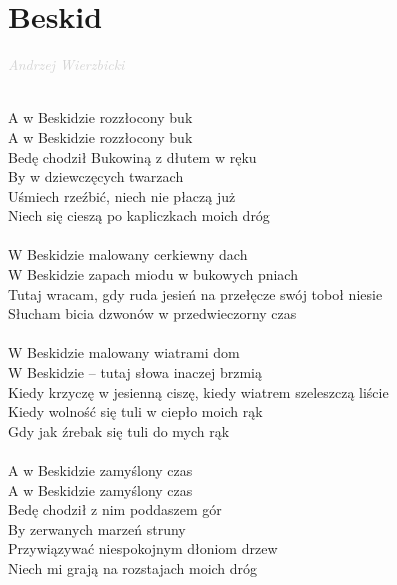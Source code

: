 \documentclass[a5paper, 10pt]{book}
\begin{document}
\newpage
\section{Beskid}\textcolor{lightgray}{\textit{Andrzej Wierzbicki}}\\~\\
\begin{minipage}[t]{0.78\textwidth}
A w Beskidzie rozzłocony buk			\\
A w Beskidzie rozzłocony buk 				\\
Bedę chodził Bukowiną z dłutem w ręku			\\
By w dziewczęcych twarzach		\\
Uśmiech rzeźbić, niech nie płaczą już		\\
Niech się cieszą po kapliczkach moich dróg\\
\\
\hspace*{4mm}W Beskidzie malowany cerkiewny dach 			\\
\hspace*{4mm}W Beskidzie zapach miodu w bukowych pniach 		\\
\hspace*{4mm}Tutaj wracam, gdy ruda jesień na przełęcze swój toboł niesie\\
\hspace*{4mm}Słucham bicia dzwonów w przedwieczorny czas 		\\
\\
\hspace*{4mm}W Beskidzie malowany wiatrami dom\\
\hspace*{4mm}W Beskidzie – tutaj słowa inaczej brzmią\\
\hspace*{4mm}Kiedy krzyczę w jesienną ciszę, kiedy wiatrem szeleszczą liście\\
\hspace*{4mm}Kiedy wolność się tuli w ciepło moich rąk\\
\hspace*{4mm}Gdy jak źrebak się tuli do mych rąk\\
\\
A w Beskidzie zamyślony czas\\
A w Beskidzie zamyślony czas\\
Bedę chodził z nim poddaszem gór\\
By zerwanych marzeń struny\\
Przywiązywać niespokojnym dłoniom drzew\\
Niech mi grają na rozstajach moich dróg\\
\end{minipage}
\end{document}
